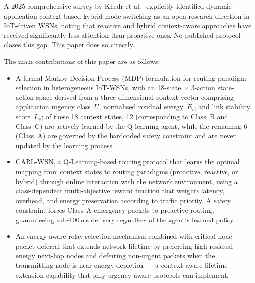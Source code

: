 \documentclass[12pt]{article}
\begin{document}
A 2025 comprehensive survey by Khedr et al.~\cite{roberts2025}
explicitly identified dynamic application-context-based hybrid mode
switching as an open research direction in IoT-driven WSNs, noting
that reactive and hybrid context-aware approaches have received
significantly less attention than proactive ones. No published protocol closes this gap. This paper does so directly.

The main contributions of this paper are as follows:

\begin{itemize}
\item A formal Markov Decision Process (MDP) formulation for routing
paradigm selection in heterogeneous IoT-WSNs, with an 18-state
$\times$ 3-action state-action space derived from a three-dimensional
context vector comprising application urgency class~$U$, normalised
residual energy~$E_r$, and link stability score~$L_s$; of these 18
context states, 12 (corresponding to Class~B and Class~C) are
actively learned by the Q-learning agent, while the remaining 6
(Class~A) are governed by the hardcoded safety constraint and are
never updated by the learning process.

\item CARL-WSN, a Q-Learning-based routing protocol that learns the
optimal mapping from context states to routing paradigms (proactive,
reactive, or hybrid) through online interaction with the network
environment, using a class-dependent multi-objective reward function
that weights latency, overhead, and energy preservation according to
traffic priority. A safety constraint forces Class~A emergency
packets to proactive routing, guaranteeing sub-100\,ms delivery
regardless of the agent's learned policy.

\item An energy-aware relay selection mechanism combined with
critical-node packet deferral that extends network lifetime by
preferring high-residual-energy next-hop nodes and deferring
non-urgent packets when the transmitting node is near energy
depletion --- a context-aware lifetime extension capability that
only urgency-aware protocols can implement.


\end{itemize}
\end{document}
